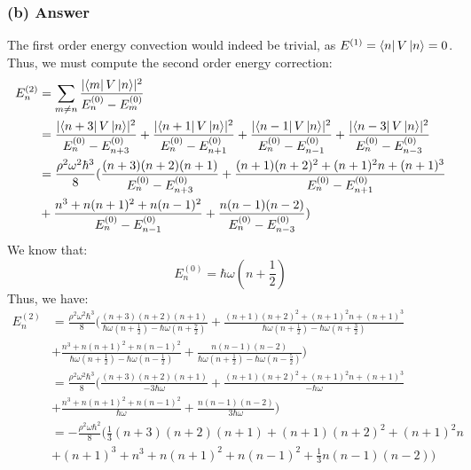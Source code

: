\documentclass{article}
\begin{document}
\subsubsection*{(b) Answer}
The first order energy convection would indeed be trivial, as $E^{(1)} = \bra{n}V\ket{n} = 0$. Thus, we must compute the second order energy correction:
\begin{align}
    E^{(2)}_n &= \sum_{m \neq n} \frac{\lvert \bra{m}V\ket{n} \rvert^2}{E_n^{(0)} - E_m^{(0)}} \\
    &= \frac{\lvert \bra{n+3}V\ket{n} \rvert^2}{E_n^{(0)} - E_{n+3}^{(0)}} + \frac{\lvert \bra{n+1}V\ket{n} \rvert^2}{E_n^{(0)} - E_{n+1}^{(0)}} + \frac{\lvert \bra{n-1}V\ket{n} \rvert^2}{E_n^{(0)} - E_{n-1}^{(0)}} + \frac{\lvert \bra{n-3}V\ket{n} \rvert^2}{E_n^{(0)} - E_{n-3}^{(0)}} \\
    &= \frac{\rho^2 \omega^2 \hbar^3}{8} (\frac{(n+3)(n+2)(n+1)}{E_n^{(0)} - E_{n+3}^{(0)}} + \frac{{(n+1)(n+2)^2} + {(n+1)^2n} + {(n+1)^3}}{E_n^{(0)} - E_{n+1}^{(0)}} \\
&+ \frac{{n^3} + {n(n+1)^2} + {n(n-1)^2}}{E_n^{(0)} - E_{n-1}^{(0)}} + \frac{n(n-1)(n-2)}{E_n^{(0)} - E_{n-3}^{(0)}} ) \\
\end{align}
We know that:
\begin{equation}
    E_n^{(0)} = \hbar \omega \left( n + \frac{1}{2} \right)
\end{equation}
Thus, we have:
\begin{align}
    E^{(2)}_n &= \frac{\rho^2 \omega^2 \hbar^3}{8} (\frac{(n+3)(n+2)(n+1)}{\hbar \omega \left( n + \frac{1}{2} \right) - \hbar \omega \left( n + \frac{7}{2} \right)} + \frac{{(n+1)(n+2)^2} + {(n+1)^2n} + {(n+1)^3}}{\hbar \omega \left( n + \frac{1}{2} \right) - \hbar \omega \left( n + \frac{3}{2} \right)} \\
&+ \frac{{n^3} + {n(n+1)^2} + {n(n-1)^2}}{\hbar \omega \left( n + \frac{1}{2} \right) - \hbar \omega \left( n - \frac{1}{2} \right)} + \frac{n(n-1)(n-2)}{\hbar \omega \left( n + \frac{1}{2} \right) - \hbar \omega \left( n - \frac{5}{2} \right)} ) \\
&= \frac{\rho^2 \omega^2 \hbar^3}{8} (\frac{(n+3)(n+2)(n+1)}{-3\hbar\omega } + \frac{{(n+1)(n+2)^2} + {(n+1)^2n} + {(n+1)^3}}{-\hbar\omega } \\
&+ \frac{{n^3} + {n(n+1)^2} + {n(n-1)^2}}{\hbar\omega } + \frac{n(n-1)(n-2)}{3\hbar\omega } ) \\
&= -\frac{\rho ^2 \omega \hbar^2}{8}  (\frac{1}{3} (n+3)(n+2)(n+1) + (n+1)(n+2)^2 + (n+1)^2n\\
&+ (n+1)^3 + n^3 + n(n+1)^2 + n(n-1)^2 + \frac{1}{3} n(n-1)(n-2))  \\
\end{align}
\end{document}
